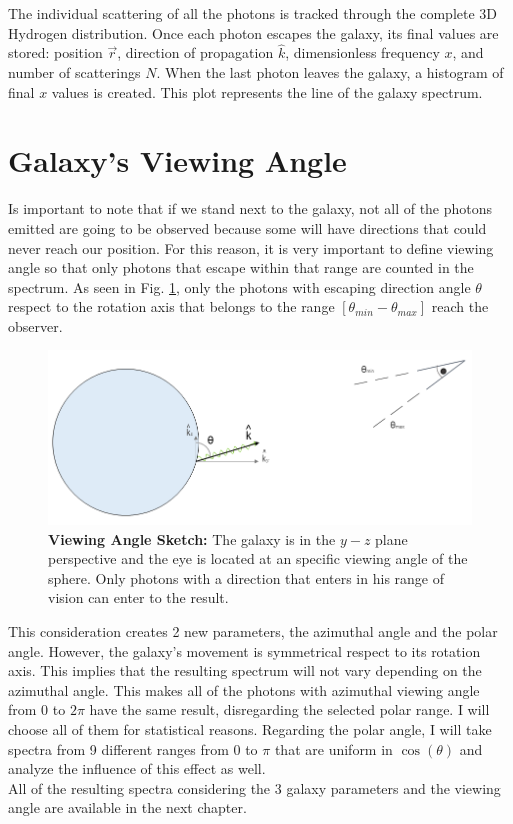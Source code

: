 The individual scattering of all the photons is tracked through the complete 3D Hydrogen distribution. Once each photon escapes the galaxy, its final values are stored: position $\vec{r}$, direction of propagation $\hat{k}$, dimensionless frequency $x$, and number of scatterings $N$. When the last photon leaves the galaxy, a histogram of final $x$ values is created. This plot represents the \lya line of the galaxy spectrum.\\


\section{Galaxy's Viewing Angle}
Is important to note that if we stand next to the galaxy, not all of the photons emitted are going to be observed because some will have directions that could never reach our position. For this reason, it is very important to define viewing angle so that only photons that escape within that range are counted in the spectrum. As seen in Fig. \ref{fig:viewing_angle_sketch}, only the photons with escaping direction angle $\theta$ respect to the rotation axis that belongs to the range $[\theta_{min}-\theta_{max}]$ reach the observer. \\

\begin{figure}[h!]
	\begin{center}
		\includegraphics[width=1\textwidth]{./figures/chapter2/viewing_angle_sketch}
	\end{center}
	\caption{\textbf{Viewing Angle Sketch:} The galaxy is in the $y-z$ plane perspective and the eye is located at an specific viewing angle of the sphere. Only photons with a direction that enters in his range of vision can enter to the result.
		\label{fig:viewing_angle_sketch}}
\end{figure}

This consideration creates 2 new parameters, the azimuthal angle and the polar angle. However, the galaxy's movement is symmetrical respect to its rotation axis. This implies that the resulting spectrum will not vary depending on the azimuthal angle. This makes all of the photons with azimuthal viewing angle from $0$ to $2\pi$ have the same result, disregarding the selected polar range. I will choose all of them for statistical reasons. Regarding the polar angle, I will take spectra from 9 different ranges from $0$ to $\pi$ that are uniform in $\cos(\theta)$ and analyze the influence of this effect as well. \\ 

All of the resulting spectra considering the 3 galaxy parameters and the viewing angle are available in the next chapter. 
